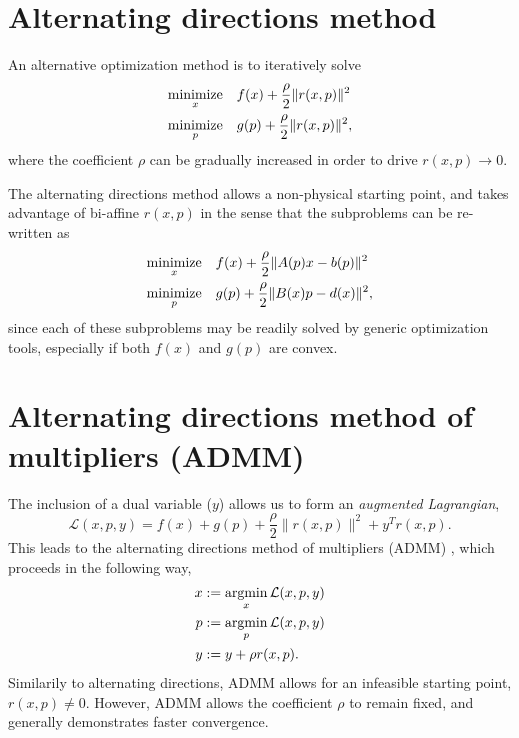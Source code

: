 \documentclass{article}
\begin{document}
\section{Alternating directions method}
An alternative optimization method is to iteratively solve
    \begin{subequations}\begin{align}
    \mathop{\rm minimize}_x \quad   & f(x) + \frac{\rho}{2} \| r(x,p) \|^2 \\
    \mathop{\rm minimize}_p \quad   & g(p) + \frac{\rho}{2} \| r(x,p) \|^2,
    \end{align}\end{subequations}
    where the coefficient $\rho$ can be 
    gradually increased in order to drive $r(x,p) \to 0$.

The alternating directions method allows a non-physical starting point,
    and takes advantage of bi-affine $r(x,p)$ in the sense that 
    the subproblems can be re-written as
    \begin{subequations}\begin{align}
    \mathop{\rm minimize}_x \quad   & f(x) + 
        \frac{\rho}{2} \| A(p)x - b(p) \|^2 \\
    \mathop{\rm minimize}_p \quad   & g(p) + 
        \frac{\rho}{2} \| B(x)p - d(x) \|^2,
    \end{align}\end{subequations}
    since each of these subproblems may be readily 
    solved by generic optimization tools,
    especially if both $f(x)$ and $g(p)$ are convex.

\section{Alternating directions method of multipliers (ADMM)}
The inclusion of a dual variable ($y$) allows 
    us to form an \emph{augmented Lagrangian},
    \begin{equation}
    \mathcal{L}(x, p, y) = f(x) + g(p) + 
        \frac{\rho}{2} \| r(x,p) \|^2 + y^T r(x,p).
    \end{equation}
This leads to the 
    alternating directions method of multipliers (ADMM) \cite{ADMM},
    which proceeds in the following way,
    \begin{subequations}\begin{align}
    x &:= \mathop{\rm argmin}_x \mathcal{L}(x,p,y) \\
    p &:= \mathop{\rm argmin}_p \mathcal{L}(x,p,y) \\
    y &:= y + \rho r(x,p).
    \end{align}\end{subequations}
Similarily to alternating directions, 
    ADMM allows for an infeasible starting point, $r(x,p) \neq 0$.
However, ADMM allows the coefficient $\rho$ to remain fixed,
    and generally demonstrates faster convergence.
\end{document}
